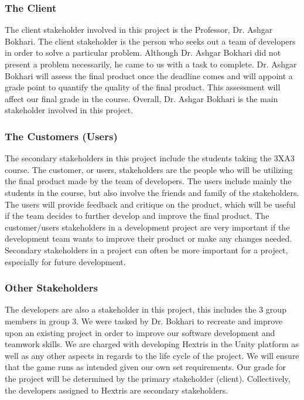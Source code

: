 \documentclass[12pt, titlepage]{article}
\begin{document}
\subsubsection{The Client}
The client stakeholder involved in this project is the Professor, Dr. Ashgar Bokhari. The client stakeholder is the person who seeks out a team of developers in order to solve a particular problem. Although Dr. Ashgar Bokhari did not present a problem necessarily, he came to us with a task to complete. Dr. Ashgar Bokhari will assess the final product once the deadline comes and will appoint a grade point to quantify the quality of the final product. This assessment will affect our final grade in the course. Overall, Dr. Ashgar Bokhari is the main stakeholder involved in this project.

\subsubsection{The Customers (Users)}
The secondary stakeholders in this project include the students taking the 3XA3 course. The customer, or users, stakeholders are the people who will be utilizing the final product made by the team of developers. The users include mainly the students in the course, but also involve the friends and family of the stakeholders. The users will provide feedback and critique on the product, which will be useful if the team decides to further develop and improve the final product. The customer/users stakeholders in a development project are very important if the development team wants to improve their product or make any changes needed. Secondary stakeholders in a project can often be more important for a project, especially for future development.

\subsubsection{Other Stakeholders}
The developers are also a stakeholder in this project, this includes the 3 group members in group 3. We were tasked by Dr. Bokhari to recreate and improve upon an existing project in order to improve our software development and teamwork skills. We are charged with developing Hextris in the Unity platform as well as any other aspects in regards to the life cycle of the project. We will ensure that the game runs as intended given our own set requirements. Our grade for the project will be determined by the primary stakeholder (client). Collectively, the developers assigned to Hextris are secondary stakeholders.
\end{document}
